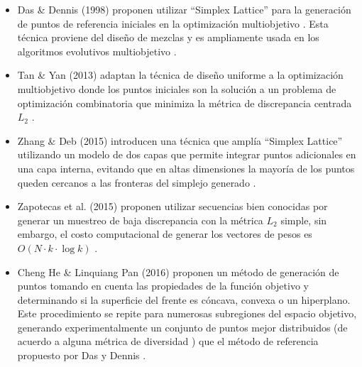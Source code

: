 \documentclass[letterpaper,10pt]{article}
\begin{document}



\begin{itemize}
 \item Das \& Dennis (1998) proponen utilizar ``Simplex Lattice'' para la generación de puntos de referencia iniciales en la optimización multiobjetivo \cite{Das:1998:NIN:588907.589322}. Esta técnica proviene del diseño de mezclas y es ampliamente usada en los algoritmos evolutivos multiobjetivo \cite{4358754,6600851}.
 \item Tan \& Yan (2013) adaptan la técnica de diseño uniforme \cite{fang2000uniform} a la optimización multiobjetivo donde los puntos iniciales son la solución a un problema de optimización combinatoria que minimiza la métrica de discrepancia centrada $L_2$ \cite{tan2013moea,fang2002centered}.
 \item Zhang \& Deb (2015) introducen una técnica que amplía ``Simplex Lattice'' utilizando un modelo de dos capas que permite integrar puntos adicionales en una capa interna, evitando que en altas dimensiones la mayoría de los puntos queden cercanos a las fronteras del simplejo generado \cite{li2015evolutionary}.
 \item Zapotecas et al. (2015) proponen utilizar secuencias bien conocidas por generar un muestreo de baja discrepancia con la métrica $L_2$ simple, sin embargo, el costo computacional de generar los vectores de pesos es $O(N \cdot k \cdot \log k)$ \cite{zapotecas2015low}.
 \item Cheng He \& Linquiang Pan (2016) proponen un método de generación de puntos tomando en cuenta las propiedades de la función objetivo y determinando si la superficie del frente es cóncava, convexa o un hiperplano. Este procedimiento se repite para numerosas subregiones del espacio objetivo, generando experimentalmente un conjunto de puntos mejor distribuidos (de acuerdo a alguna métrica de diversidad ) que el método de referencia propuesto por Das y Dennis \cite{7748353}.
\end{itemize}
\end{document}
